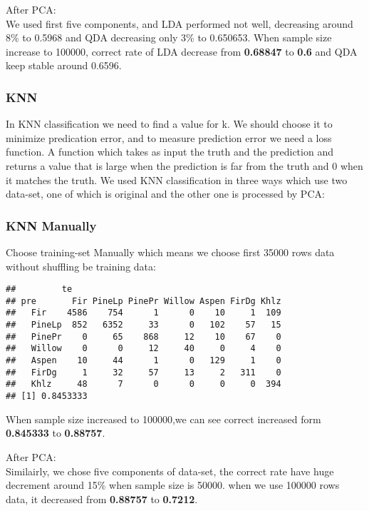 \documentclass{article}\usepackage[]{graphicx}\usepackage[]{color}
\makeatletter
\newenvironment{kframe}{%
 \def\at@end@of@kframe{}%
 \ifinner\ifhmode%
  \def\at@end@of@kframe{\end{minipage}}%
  \begin{minipage}{\columnwidth}%
 \fi\fi%
 \def\FrameCommand##1{\hskip\@totalleftmargin \hskip-\fboxsep
 \colorbox{shadecolor}{##1}\hskip-\fboxsep
     \hskip-\linewidth \hskip-\@totalleftmargin \hskip\columnwidth}%
 \MakeFramed {\advance\hsize-\width
   \@totalleftmargin\z@ \linewidth\hsize
   \@setminipage}}%
 {\par\unskip\endMakeFramed%
 \at@end@of@kframe}
\newenvironment{knitrout}{}{} %
\makeatother
\begin{document}
\noindent After PCA:\\
\noindent We used first five components, and LDA performed not well, decreasing around 8\% to 0.5968 and QDA decreasing only 3\% to 0.650653.
When sample size increase to 100000, correct rate of LDA decrease from \textbf{0.68847} to \textbf{0.6} and QDA keep stable around 0.6596.\\


	\subsubsection{KNN}
\noindent	In KNN classification we need to find a value for k. We should choose it to
	minimize predication error, and to measure prediction error we need a loss function. 
	A function which takes as input the truth and the prediction and returns a value that is large when the prediction is far from the 
	truth and 0 when it matches the truth.\cite{4} 
	We used KNN classification in three ways which use two data-set, one of which is original and the other one is processed by PCA:\\
	\subsubsection{KNN Manually}
	\noindent	Choose training-set Manually which means we choose first 35000 rows data without shuffling be training data:\\
\begin{knitrout}
\color{fgcolor}\begin{kframe}
\begin{verbatim}
##         te
## pre       Fir PineLp PinePr Willow Aspen FirDg Khlz
##   Fir    4586    754      1      0    10     1  109
##   PineLp  852   6352     33      0   102    57   15
##   PinePr    0     65    868     12    10    67    0
##   Willow    0      0     12     40     0     4    0
##   Aspen    10     44      1      0   129     1    0
##   FirDg     1     32     57     13     2   311    0
##   Khlz     48      7      0      0     0     0  394
## [1] 0.8453333
\end{verbatim}
\end{kframe}
\end{knitrout}
	\noindent	When sample size increased to 100000,we can see correct increased form \textbf{0.845333} to \textbf{0.88757}.

	After PCA:\\
	Similairly, we chose five components of data-set, the correct rate have huge decrement around 15\% when sample size is 50000.
	when we use 100000 rows data, it decreased from \textbf{0.88757} to \textbf{0.7212}.
\end{document}
